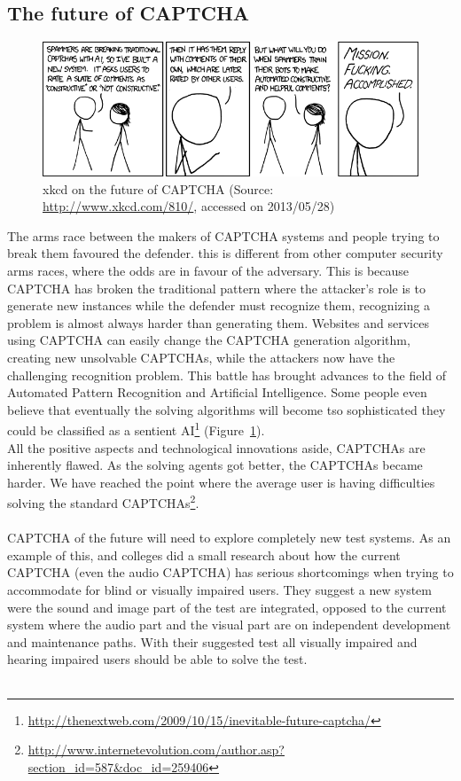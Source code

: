 \documentclass[pdftex,a4paper,12pt,twoside]{report}
\theoremstyle{plain} \newtheorem{theorem}{Theorem} \newtheorem{proposition}{Proposition} \newtheorem{lemma}{Lemma} \newtheorem*{corollary}{Corollary}
\theoremstyle{definition} \newtheorem{definition}{Definition} \newtheorem{conjecture}{Conjecture} \newtheorem*{example}{Example} \newtheorem{algorithm}{Algorithm}
\theoremstyle{remark} \newtheorem*{remark}{Remark} \newtheorem*{note}{Note} \newtheorem{case}{Case}
\begin{document}
\subsection{The future of CAPTCHA}
\begin{figure}
	\centering
	\includegraphics[width=13.75cm]{./img/xkcd-captcha-evolution.png}
	\caption{xkcd on the future of CAPTCHA (Source: \url{http://www.xkcd.com/810/}, accessed on 2013/05/28)}
	\label{fig:xkcdCAPTCHA}
\end{figure}
The arms race between the makers of CAPTCHA systems and people trying to break them favoured the defender. this is different from other computer security arms races, where the odds are in favour of the adversary. This is because CAPTCHA has broken the traditional pattern where the attacker's role is to generate new instances while the defender must recognize them, recognizing a problem is almost always harder than generating them. Websites and services using CAPTCHA can easily change the CAPTCHA generation algorithm, creating new unsolvable CAPTCHAs, while the attackers now have the challenging recognition problem. This battle has brought advances to the field of Automated Pattern Recognition and Artificial Intelligence. Some people even believe that eventually the solving algorithms will become tso sophisticated they could be classified as a sentient AI\footnote{\url{http://thenextweb.com/2009/10/15/inevitable-future-captcha/}} (Figure~\ref{fig:xkcdCAPTCHA}).\\
All the positive aspects and technological innovations aside, CAPTCHAs are inherently flawed. As the solving agents got better, the CAPTCHAs became harder. We have reached the point where the average user is having difficulties solving the standard CAPTCHAs\footnote{\url{http://www.internetevolution.com/author.asp?section_id=587&doc_id=259406}}. \\\\
CAPTCHA of the future will need to explore completely new test systems. As an example of this, \citep{Sauer2008} and colleges did a small research about how the current CAPTCHA (even the audio CAPTCHA) has serious shortcomings when trying to accommodate for blind or visually impaired users. They suggest a new system were the sound and image part of the test are integrated, opposed to the current system where the audio part and the visual part are on independent development and maintenance paths. With their suggested test all visually impaired and hearing impaired users should be able to solve the test.\\\\
\end{document}
